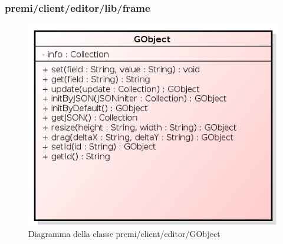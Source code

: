\subsubsection{premi/client/editor/lib/frame}
\begin{figure}[h]
\begin{center}
\includegraphics[scale=0.40]{img/diacla/GObject.png}
\caption{Diagramma della classe premi/client/editor/GObject}
\end{center}
\end{figure}

